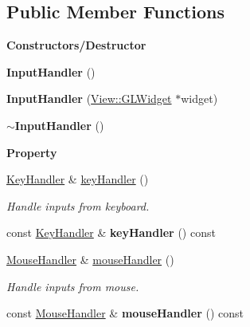 \subsection*{Public Member Functions}
\begin{Indent}\textbf{ Constructors/\+Destructor}\par
\begin{DoxyCompactItemize}
\item 
\mbox{\label{classrev_1_1_input_handler_a16810e5e27c6a88b14f2d4a65b17ea4f}} 
{\bfseries Input\+Handler} ()
\item 
\mbox{\label{classrev_1_1_input_handler_aaa1ce17789fae0036513649432d5a202}} 
{\bfseries Input\+Handler} (\mbox{\hyperlink{classrev_1_1_view_1_1_g_l_widget}{View\+::\+G\+L\+Widget}} $\ast$widget)
\item 
\mbox{\label{classrev_1_1_input_handler_a6b765dd5c270b5a5899b7c2570833bc7}} 
{\bfseries $\sim$\+Input\+Handler} ()
\end{DoxyCompactItemize}
\end{Indent}
\begin{Indent}\textbf{ Property}\par
\begin{DoxyCompactItemize}
\item 
\mbox{\label{classrev_1_1_input_handler_a60d1ac8c81263c03bdd2983d7d69a7bc}} 
\mbox{\hyperlink{classrev_1_1_key_handler}{Key\+Handler}} \& \mbox{\hyperlink{classrev_1_1_input_handler_a60d1ac8c81263c03bdd2983d7d69a7bc}{key\+Handler}} ()
\begin{DoxyCompactList}\small\item\em Handle inputs from keyboard. \end{DoxyCompactList}\item 
\mbox{\label{classrev_1_1_input_handler_a745420012e8cb9d93352ef51cac594a2}} 
const \mbox{\hyperlink{classrev_1_1_key_handler}{Key\+Handler}} \& {\bfseries key\+Handler} () const
\item 
\mbox{\label{classrev_1_1_input_handler_af8ea40be21d8ef691c10af5052ca17e5}} 
\mbox{\hyperlink{classrev_1_1_mouse_handler}{Mouse\+Handler}} \& \mbox{\hyperlink{classrev_1_1_input_handler_af8ea40be21d8ef691c10af5052ca17e5}{mouse\+Handler}} ()
\begin{DoxyCompactList}\small\item\em Handle inputs from mouse. \end{DoxyCompactList}\item 
\mbox{\label{classrev_1_1_input_handler_ad18f0be51b19649fb45b6d552a067212}} 
const \mbox{\hyperlink{classrev_1_1_mouse_handler}{Mouse\+Handler}} \& {\bfseries mouse\+Handler} () const
\end{DoxyCompactItemize}
\end{Indent}
